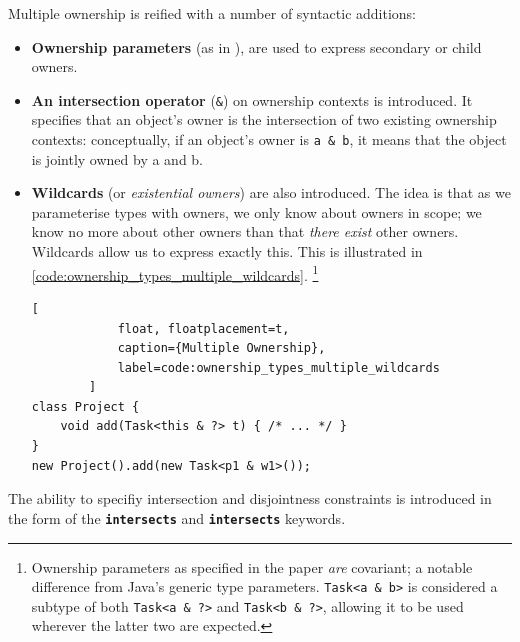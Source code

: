 \documentclass{acm_proc_article-sp}
\begin{document}
Multiple ownership is reified with a number of syntactic additions:

\begin{itemize}

    \item \textbf{Ownership parameters} (as in \cite{boyapati04safejava}), are
        used to express secondary or child owners.

    \item \textbf{An intersection operator} (\lstinline|&|) on ownership
        contexts is introduced. It specifies that an object's owner is the
        intersection of two existing ownership contexts: conceptually, if an
        object's owner is \lstinline|a & b|, it means that the object is jointly
        owned by a and b.

    \item \textbf{Wildcards} (or \textit{existential owners}) are also
        introduced. The idea is that as we parameterise types with owners, we
        only know about owners in scope; we know no more about other owners than
        that \textit{there exist} other owners. Wildcards allow us to express
        exactly this. This is illustrated in
        \cref{code:ownership_types_multiple_wildcards}. \footnote{Ownership
        parameters as specified in the paper \textit{are} covariant; a
        notable difference from Java's generic type parameters.
        \lstinline|Task<a & b>| is considered a subtype of both
        \lstinline|Task<a & ?>| and \lstinline|Task<b & ?>|, allowing it to be
        used wherever the latter two are expected.}

        \begin{lstlisting}[
            float, floatplacement=t,
            caption={Multiple Ownership},
            label=code:ownership_types_multiple_wildcards
        ]
class Project {
	void add(Task<this & ?> t) { /* ... */ }
}
new Project().add(new Task<p1 & w1>());
        \end{lstlisting}

\end{itemize}

The ability to specifiy intersection and disjointness constraints is
introduced in the form of the \textbf{\lstinline|intersects|} and
\textbf{\lstinline|intersects|} keywords.
\end{document}
